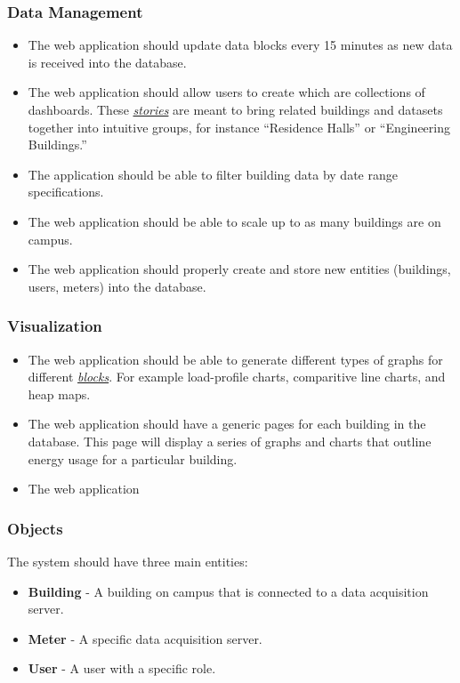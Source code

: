 \documentclass[onecolumn, draftclsnofoot,10pt, compsoc]{IEEEtran}
\begin{document}
    \subsubsection{Data Management}
    \begin{itemize}
        \item The web application should update data blocks every 15 minutes as new data is received into the database.
        \item The web application should allow users to create  which are collections of dashboards. These 
        \hyperref[definition]{\textit{stories}} are meant to bring related buildings and datasets together into intuitive groups, for instance ``Residence Halls'' or ``Engineering Buildings.''
        \item The application should be able to filter building data by date range specifications.
        \item The web application should be able to scale up to as many buildings are on campus.
        \item The web application should properly create and store new entities (buildings, users, meters) into the database.
        
    \end{itemize}    

    \subsubsection{Visualization}
    \begin{itemize}
        \item The web application should be able to generate different types of graphs for different \hyperref[definition]{\textit{blocks}}. For example load-profile charts, comparitive line charts, and heap maps.
        \item The web application should have a generic pages for each building in the database. This page will display a series of graphs and charts that outline energy usage for a particular building.
        \item The web application 
    \end{itemize}
    \subsubsection{Objects}
        The system should have three main entities: 
        \begin{itemize}
            \item \textbf{Building} - A building on campus that is connected to a data acquisition server.
            \item \textbf{Meter} - A specific data acquisition server.
            \item \textbf{User} - A user with a specific role.
        \end{itemize}
        
\end{document}
